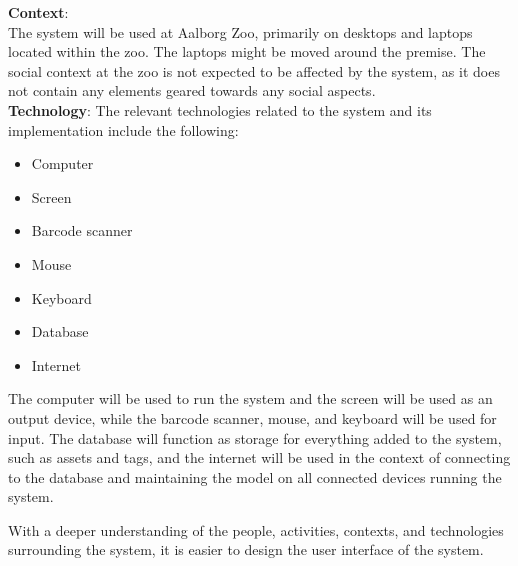 \textbf{Context}: \\
The system will be used at Aalborg Zoo, primarily on desktops and laptops located within the zoo. The laptops might be moved around the premise. The social context at the zoo is not expected to be affected by the system, as it does not contain any elements geared towards any social aspects.\\
 
\textbf{Technology}:
The relevant technologies related to the system and its implementation include the following:

\begin{itemize}
    \setlength\itemsep{0.05em}
    \item Computer
    \item Screen
    \item Barcode scanner
    \item Mouse
    \item Keyboard
    \item Database
    \item Internet
\end{itemize}

The computer will be used to run the system and the screen will be used as an output device, while the barcode scanner, mouse, and keyboard will be used for input. The database will function as storage for everything added to the system, such as assets and tags, and the internet will be used in the context of connecting to the database and maintaining the model on all connected devices running the system.
\par
With a deeper understanding of the people, activities, contexts, and technologies surrounding the system, it is easier to design the user interface of the system.